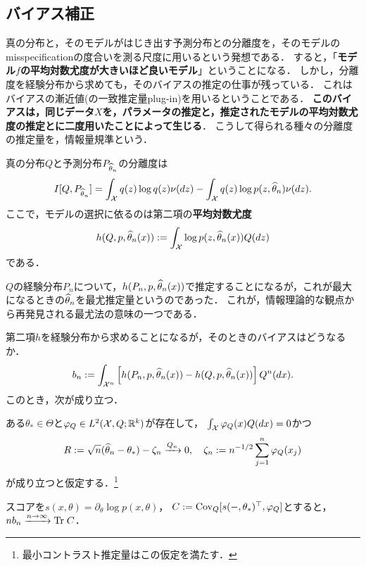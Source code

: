 \documentclass[uplatex,dvipdfmx]{jsreport}
\begin{document}
\subsection{バイアス補正}

\begin{tcolorbox}[colframe=ForestGreen, colback=ForestGreen!10!white,breakable,colbacktitle=ForestGreen!40!white,coltitle=black,fonttitle=\bfseries\sffamily,
title=]
    真の分布と，そのモデルがはじき出す予測分布との分離度を，そのモデルのmisspecificationの度合いを測る尺度に用いるという発想である．
    すると，「\textbf{モデル$f$の平均対数尤度が大きいほど良いモデル}」ということになる．
    しかし，分離度を経験分布から求めても，そのバイアスの推定の仕事が残っている．
    これはバイアスの漸近値(の一致推定量plug-in)を用いるということである．
    \textbf{このバイアスは，同じデータ$X$を，パラメータの推定と，推定されたモデルの平均対数尤度の推定とに二度用いたことによって生じる}．
    こうして得られる種々の分離度の推定量を，情報量規準という．
\end{tcolorbox}

\begin{discussion}[KL情報量の最小化と平均対数尤度の最大化は同値]
    真の分布$Q$と予測分布$P_{\widehat{\theta}_n}$の分離度は
    \[I[Q,P_{\widehat{\theta}_n}]=\int_{\mathcal{X}} q(z)\log q(z)\nu(dz)-\int_{\mathcal{X}} q(z)\log p(z,\widehat{\theta}_n)\nu(dz).\]
    ここで，モデルの選択に依るのは第二項の\textbf{平均対数尤度}
    \[h(Q,p,\widehat{\theta}_n(x)):=\int_{\mathcal{X}}\log p(z,\widehat{\theta}_n(x))Q(dz)\]
    である．
\end{discussion}
\begin{remarks}
    $Q$の経験分布$P_n$について，$h(P_n,p,\widehat{\theta}_n(x))$で推定することになるが，これが最大になるときの$\widehat{\theta}_n$を最尤推定量というのであった．
    これが，情報理論的な観点から再発見される最尤法の意味の一つである．
\end{remarks}

\begin{discussion}[バイアスの推定]
    第二項$h$を経験分布から求めることになるが，そのときのバイアスはどうなるか．
    \[b_n:=\int_{\mathcal{X}^n}\left[h(P_n,p,\widehat{\theta}_n(x))-h(Q,p,\widehat{\theta}_n(x))\right]Q^n(dx).\]
    このとき，次が成り立つ．
\end{discussion}

\begin{theorem}
    ある$\theta_*\in\Theta$と$\varphi_Q\in L^2(\mathcal{X},Q;\mathbb{R}^k)$が存在して，
    $\int_{\mathcal{X}}\varphi_Q(x)Q(dx)=0$かつ
    \[R:=\sqrt{n}(\widehat{\theta}_n-\theta_*)-\zeta_n\xrightarrow{Q_n}0,\quad\zeta_n:=n^{-1/2}\sum_{j=1}^n\varphi_Q(x_j)\]
    が成り立つと仮定する．\footnote{最小コントラスト推定量はこの仮定を満たす．}

    スコアを$s(x,\theta)=\partial_\theta\log p(x,\theta)$，
    $C:=\mathrm{Cov}_Q[s(-,\theta_*)^\top,\varphi_Q]$とすると，
    $nb_n\xrightarrow{n\to\infty}\mathrm{Tr}\; C$．
\end{theorem}
\end{document}
